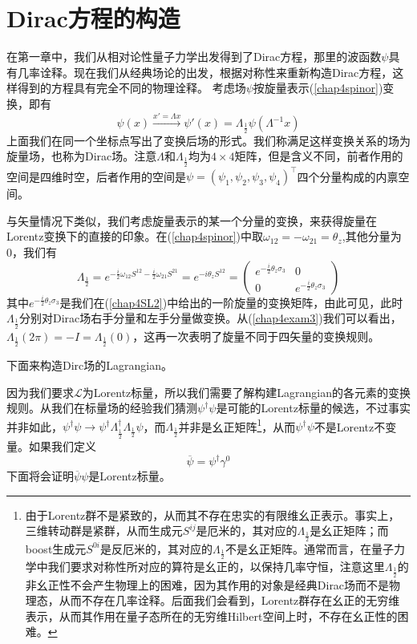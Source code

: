 \section{Dirac方程的构造}
在第一章中，我们从相对论性量子力学出发得到了Dirac方程，那里的波函数$\psi$具有几率诠释。现在我们从经典场论的出发，根据对称性来重新构造Dirac方程，这样得到的方程具有完全不同的物理诠释。
考虑场$\psi$按旋量表示(\ref{chap4spinor})变换，即有
\begin{equation}
\psi(x) \xrightarrow{x'=\Lambda x} \psi'(x)=\Lambda_{\frac{1}{2}}\psi(\Lambda^{-1}x)
\end{equation}
上面我们在同一个坐标点写出了变换后场的形式。我们称满足这样变换关系的场为旋量场，也称为Dirac场。注意$\Lambda$和$\Lambda_{\frac{1}{2}}$均为$4\times 4$矩阵，但是含义不同，前者作用的空间是四维时空，后者作用的空间是$\psi=(\psi_{1},\psi_{2},\psi_{3},\psi_{4})^{\top}$四个分量构成的内禀空间。

与矢量情况下类似，我们考虑旋量表示的某一个分量的变换，来获得旋量在Lorentz变换下的直接的印象。在(\ref{chap4spinor})中取$\omega_{12}=-\omega_{21}=\theta_{z}$,其他分量为0，我们有
\begin{equation}
\label{chap4exam3}
    \Lambda_{\frac{1}{2}}=e^{-\frac{i}{2}\omega_{12}S^{12}-\frac{i}{2}\omega_{21}S^{21}}=e^{-i\theta_{z} S^{12}}=\left(\begin{array}{cc}
       e^{-\frac{i}{2}\theta_{z}\sigma_{3}}  &0  \\
        0 & e^{-\frac{i}{2}\theta_{z}\sigma_{3}} 
    \end{array}\right)
\end{equation}
其中$e^{-\frac{i}{2}\theta_{z}\sigma_{3}}$是我们在(\ref{chap4SL2})中给出的一阶旋量的变换矩阵，由此可见，此时$\Lambda_{\frac{1}{2}}$分别对Dirac场右手分量和左手分量做变换。从(\ref{chap4exam3})我们可以看出，$\Lambda_{\frac{1}{2}}(2\pi)=-I=\Lambda_{\frac{1}{2}}(0)$，这再一次表明了旋量不同于四矢量的变换规则。

下面来构造Dirc场的Lagrangian。

因为我们要求$\mathcal{L}$为Lorentz标量，所以我们需要了解构建Lagrangian的各元素的变换规则。从我们在标量场的经验我们猜测$\psi^{\dagger}\psi$是可能的Lorentz标量的候选，不过事实并非如此，$\psi^{\dagger}\psi \rightarrow \psi^{\dagger}\Lambda_{\frac{1}{2}}^{\dagger}\Lambda_{\frac{1}{2}}\psi $，而$\Lambda_{\frac{1}{2}}$并非是幺正矩阵\footnote{由于Lorentz群不是紧致的，从而其不存在忠实的有限维幺正表示。事实上，三维转动群是紧群，从而生成元$S^{ij}$是厄米的，其对应的$\Lambda_{\frac{1}{2}}$是幺正矩阵；而boost生成元$S^{0i}$是反厄米的，其对应的$\Lambda_{\frac{1}{2}}$不是幺正矩阵。通常而言，在量子力学中我们要求对称性所对应的算符是幺正的，以保持几率守恒，注意这里$\Lambda_{\frac{1}{2}}$的非幺正性不会产生物理上的困难，因为其作用的对象是经典Dirac场而不是物理态，从而不存在几率诠释。后面我们会看到，Lorentz群存在幺正的无穷维表示，从而其作用在量子态所在的无穷维Hilbert空间上时，不存在幺正性的困难。}，从而$\psi^{\dagger}\psi$不是Lorentz不变量。如果我们定义
\begin{equation}
    \overline{\psi}=\psi^{\dagger}\gamma^{0}
\end{equation}
下面将会证明$\overline{\psi}\psi$是Lorentz标量。

